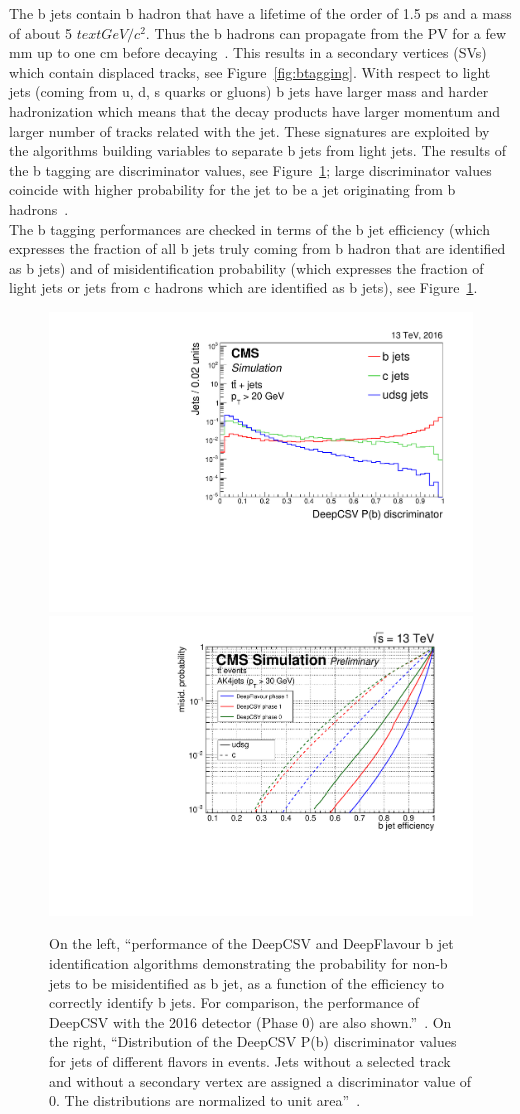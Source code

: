 The b jets contain b hadron that have a lifetime of the order of 1.5
ps and a mass of about
5 $text{GeV}/c^{2}$. Thus the b hadrons can propagate from
the PV for a few mm up to one cm before decaying~\cite{Sirunyan_2018_btagging}. This results in
a secondary vertices (SVs) which contain displaced tracks, see
Figure~\ref{fig:btagging}. With respect to light jets (coming from
u, d, s quarks or gluons) b jets have larger mass and harder hadronization which
means that the decay products have larger momentum and larger number
of tracks related with the jet. These signatures are exploited by the
algorithms building variables to separate b jets from
light jets. The results of the b tagging are discriminator values, see Figure~\ref{fig:taggingperformance}; large discriminator values coincide with higher probability for
the jet to be a jet originating from b hadrons~\cite{CMS-DP-2017-013,
  csv}.\\
The b tagging performances are checked in terms of the b jet
efficiency (which expresses the fraction of all b jets truly coming from b hadron
that are identified as b jets) and of misidentification probability
(which expresses the fraction of light jets or jets from c hadrons
which are identified as b jets), see
Figure~\ref{fig:taggingperformance}. 

\begin{figure}[h]
\centering
\includegraphics[width=.49\textwidth]{Figures/c2/CMS-BTV-16-002_Figure_013-a.pdf}
\includegraphics[width=.49\textwidth]{Figures/c2/PT30GeV.pdf}
\caption{On the left, ``performance of the DeepCSV and DeepFlavour b
  jet identification algorithms demonstrating the probability for
  non-b jets to be misidentified as b jet, as a function of the
  efficiency to correctly identify b jets. For comparison, the performance of DeepCSV
  with the 2016 detector (Phase 0) are also shown.''~\cite{csv}. On
  the right, ``Distribution of the DeepCSV P(b) discriminator values
  for jets of different flavors in \ttbar events. Jets without a
  selected track and without a secondary vertex are assigned a
  discriminator value of 0. The distributions are normalized to unit area''~\cite{csv}.}
\label{fig:taggingperformance}
\end{figure}


